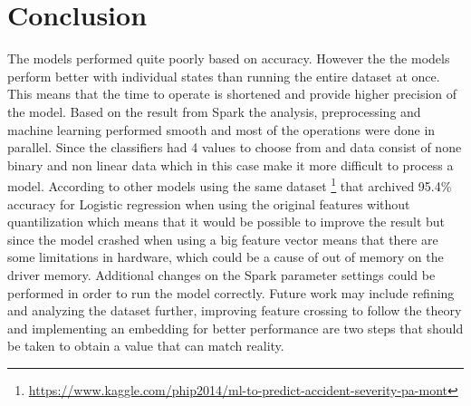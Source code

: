 \documentclass[../main.tex]{subfiles}
\begin{document}
\section{Conclusion}
The models performed quite poorly based on accuracy. However the the models perform better with individual states than running the entire dataset at once. This means that the time to operate is shortened and provide higher precision of the model. Based on the result from Spark the analysis, preprocessing and machine learning performed smooth and most of the operations were done in parallel. Since the classifiers had 4 values to choose from and data consist of none binary and non linear data which in this case make it more difficult to process a model. According to other models using the same dataset \footnote {\url{https://www.kaggle.com/phip2014/ml-to-predict-accident-severity-pa-mont}} that archived 95.4\% accuracy for Logistic regression when using the original features without quantilization which means that it would be possible to improve the result but since the model crashed when using a big feature vector means that there are some limitations in hardware, which could be a cause of out of memory on the driver memory. Additional changes on the Spark parameter settings could be performed in order to run the model correctly. Future work may include refining and analyzing the dataset further, improving feature crossing to follow the theory and implementing an embedding for better performance are two steps that should be taken to obtain a value that can match reality.
\end{document}
